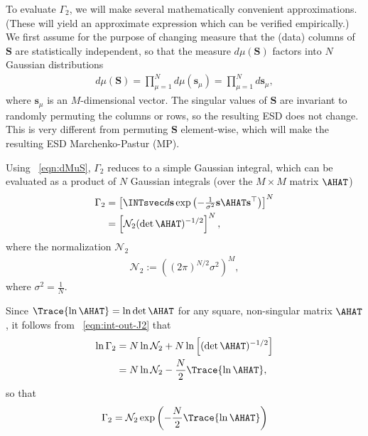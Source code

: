 To evaluate $\Gamma_2$, we will make several mathematically convenient approximations.
(These will yield an approximate expression which can be verified empirically.)
%
We first assume for the purpose of changing measure that the (data) columns of $\mathbf{S}$ are
statistically independent, so that the measure $d\mu(\mathbf{S})$ factors into $N$ Gaussian distributions
\begin{align}
\label{eqn:dMuS}
d\mu(\mathbf{S}) = \prod_{\mu=1}^{N}d\mu(\mathbf{s}_{\mu})=\prod_{\mu=1}^{N}d\mathbf{s}_{\mu} ,
\end{align}
where $\mathbf{s}_{\mu}$ is an $M$-dimensional vector.
The singular values of $\mathbf{S}$ are invariant to randomly permuting the columns or rows,
so the resulting ESD does not change.  
This is very different from permuting $\mathbf{S}$ element-wise, which will make the resulting ESD Marchenko-Pastur (MP).

Using \EQN~\ref{eqn:dMuS}, 
$\Gamma_2$ reduces to a simple Gaussian integral, which can be evaluated as a product of $N$ Gaussian integrals (over the $M \times M$ matrix $\AHAT$)
\begin{align}
\label{eqn:int-out-J2}
\Gamma_2 
   &= \left[\INTsvec d\mathbf{s} \exp\left(-\tfrac{1}{\sigma^{2}} \mathbf{s}\AHAT\mathbf{s}^{\top} \right)\right]^{N} \\
   &= \left[\mathcal{N}_2 (\det \AHAT)^{-1/2}\right]^{N}  ,
\end{align}
where the normalization $\mathcal{N}_2$
\begin{align}
\label{eqn:norm_2}
\mathcal{N}_2 := \left((2\pi)^{N/2}\sigma^{2}\right)^{M}  ,
\end{align}
where $\sigma^{2}=\frac{1}{N}$.

Since $\Trace{\ln\AHAT}=\ln \det \AHAT$ for any square, non-singular matrix $\AHAT$, 
it follows from \EQN~\ref{eqn:int-out-J2} that
\begin{align}
\nonumber
\ln\Gamma_2 
   &=N\ln\mathcal{N}_2 + N\ln\left[(\det \AHAT)^{-1/2} \right]  \\  \nonumber
   &= N\ln\mathcal{N}_2 -\frac{N}{2}\Trace{ \ln\AHAT }  ,  
\end{align}
so that
\begin{align}
\label{eqn:log-Gamma}
\Gamma_2 = \mathcal{N}_2 \exp\left( -\frac{N}{2} \Trace{ \ln\AHAT } \right) 
\end{align}

